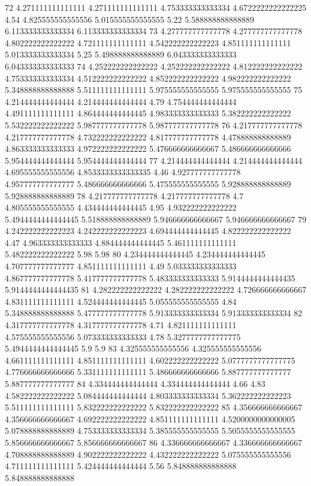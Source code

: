 72 4.271111111111111 4.271111111111111 4.753333333333334 4.6722222222222225 4.54 4.825555555555556 5.015555555555555 5.22 5.588888888888889 6.113333333333334 6.113333333333334
73 4.277777777777778 4.277777777777778 4.802222222222222 4.721111111111111 4.542222222222223 4.851111111111111 5.013333333333334 5.25 5.498888888888889 6.043333333333333 6.043333333333333
74 4.252222222222222 4.252222222222222 4.812222222222222 4.753333333333334 4.512222222222222 4.852222222222222 4.982222222222222 5.348888888888888 5.511111111111111 5.975555555555555 5.975555555555555
75 4.214444444444444 4.214444444444444 4.79 4.754444444444444 4.491111111111111 4.864444444444445 4.983333333333333 5.382222222222222 5.532222222222222 5.987777777777778 5.987777777777778
76 4.217777777777778 4.217777777777778 4.732222222222222 4.817777777777778 4.478888888888889 4.863333333333333 4.972222222222222 5.476666666666667 5.486666666666666 5.954444444444444 5.954444444444444
77 4.214444444444444 4.214444444444444 4.695555555555556 4.8533333333333335 4.46 4.927777777777778 4.957777777777777 5.486666666666666 5.475555555555555 5.928888888888889 5.928888888888889
78 4.217777777777778 4.217777777777778 4.7 4.805555555555555 4.434444444444445 4.95 4.932222222222222 5.4944444444444445 5.518888888888889 5.946666666666667 5.946666666666667
79 4.242222222222223 4.242222222222223 4.694444444444445 4.822222222222222 4.47 4.963333333333333 4.884444444444445 5.461111111111111 5.482222222222222 5.98 5.98
80 4.234444444444445 4.234444444444445 4.707777777777777 4.851111111111111 4.49 5.033333333333333 4.867777777777778 5.417777777777778 5.483333333333333 5.9144444444444435 5.9144444444444435
81 4.282222222222222 4.282222222222222 4.726666666666667 4.831111111111111 4.524444444444445 5.055555555555555 4.84 5.348888888888888 5.477777777777778 5.913333333333334 5.913333333333334
82 4.317777777777778 4.317777777777778 4.71 4.821111111111111 4.575555555555556 5.073333333333333 4.78 5.3277777777777775 5.4944444444444445 5.9 5.9
83 4.325555555555556 4.325555555555556 4.661111111111111 4.851111111111111 4.602222222222222 5.0777777777777775 4.776666666666666 5.331111111111111 5.486666666666666 5.887777777777777 5.887777777777777
84 4.334444444444444 4.334444444444444 4.66 4.83 4.582222222222222 5.084444444444444 4.803333333333334 5.362222222222223 5.511111111111111 5.832222222222222 5.832222222222222
85 4.356666666666667 4.356666666666667 4.692222222222222 4.851111111111111 4.5200000000000005 5.078888888888889 4.753333333333334 5.385555555555555 5.5055555555555555 5.856666666666667 5.856666666666667
86 4.336666666666667 4.336666666666667 4.708888888888889 4.902222222222222 4.432222222222222 5.075555555555556 4.711111111111111 5.424444444444444 5.56 5.848888888888888 5.848888888888888

